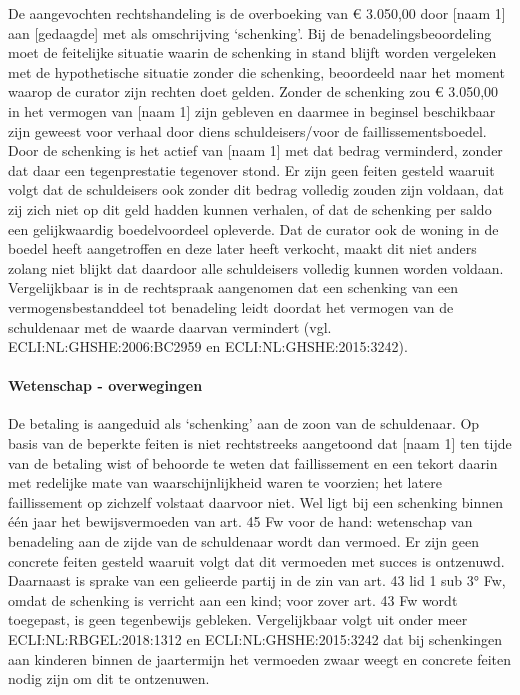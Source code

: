 \documentclass[
  dutch,
  a4paper,
]{article}
\begin{document}
De aangevochten rechtshandeling is de overboeking van € 3.050,00 door {[}naam 1{]} aan {[}gedaagde{]} met als omschrijving `schenking'. Bij de benadelingsbeoordeling moet de feitelijke situatie waarin de schenking in stand blijft worden vergeleken met de hypothetische situatie zonder die schenking, beoordeeld naar het moment waarop de curator zijn rechten doet gelden. Zonder de schenking zou € 3.050,00 in het vermogen van {[}naam 1{]} zijn gebleven en daarmee in beginsel beschikbaar zijn geweest voor verhaal door diens schuldeisers/voor de faillissementsboedel. Door de schenking is het actief van {[}naam 1{]} met dat bedrag verminderd, zonder dat daar een tegenprestatie tegenover stond. Er zijn geen feiten gesteld waaruit volgt dat de schuldeisers ook zonder dit bedrag volledig zouden zijn voldaan, dat zij zich niet op dit geld hadden kunnen verhalen, of dat de schenking per saldo een gelijkwaardig boedelvoordeel opleverde. Dat de curator ook de woning in de boedel heeft aangetroffen en deze later heeft verkocht, maakt dit niet anders zolang niet blijkt dat daardoor alle schuldeisers volledig kunnen worden voldaan. Vergelijkbaar is in de rechtspraak aangenomen dat een schenking van een vermogensbestanddeel tot benadeling leidt doordat het vermogen van de schuldenaar met de waarde daarvan vermindert (vgl. ECLI:NL:GHSHE:2006:BC2959 en ECLI:NL:GHSHE:2015:3242).

\paragraph{Wetenschap - overwegingen}\label{wetenschap---overwegingen-34}

De betaling is aangeduid als `schenking' aan de zoon van de schuldenaar. Op basis van de beperkte feiten is niet rechtstreeks aangetoond dat {[}naam 1{]} ten tijde van de betaling wist of behoorde te weten dat faillissement en een tekort daarin met redelijke mate van waarschijnlijkheid waren te voorzien; het latere faillissement op zichzelf volstaat daarvoor niet. Wel ligt bij een schenking binnen één jaar het bewijsvermoeden van art. 45 Fw voor de hand: wetenschap van benadeling aan de zijde van de schuldenaar wordt dan vermoed. Er zijn geen concrete feiten gesteld waaruit volgt dat dit vermoeden met succes is ontzenuwd. Daarnaast is sprake van een gelieerde partij in de zin van art. 43 lid 1 sub 3° Fw, omdat de schenking is verricht aan een kind; voor zover art. 43 Fw wordt toegepast, is geen tegenbewijs gebleken. Vergelijkbaar volgt uit onder meer ECLI:NL:RBGEL:2018:1312 en ECLI:NL:GHSHE:2015:3242 dat bij schenkingen aan kinderen binnen de jaartermijn het vermoeden zwaar weegt en concrete feiten nodig zijn om dit te ontzenuwen.
\end{document}
